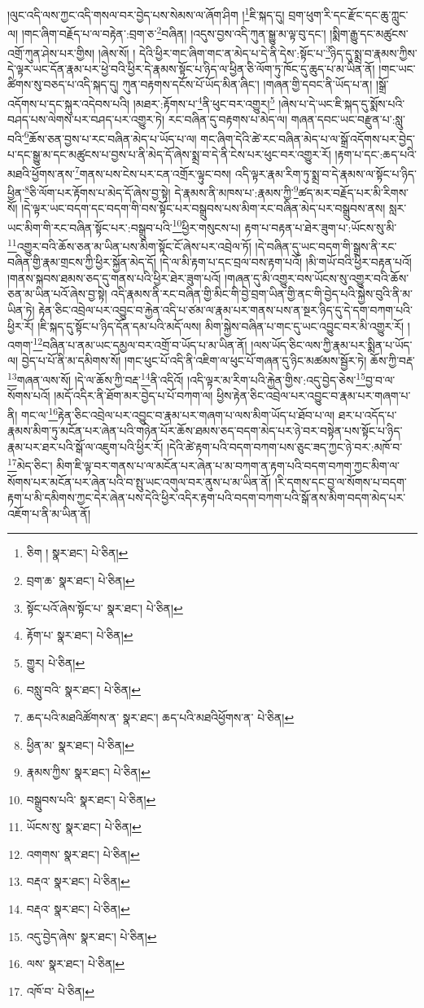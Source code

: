།ལུང་འདི་ལས་ཀྱང་འདི་གསལ་བར་བྱེད་པས་སེམས་ལ་ཞོག་ཤིག །\footnote{ཅིག །  སྣར་ཐང་།  པེ་ཅིན། }ཇི་སྐད་དུ། བྲག་ཕུག་རི་དང་རྫོང་དང་ཆུ་ཀླུང་ལ། །གང་ཞིག་བརྗོད་པ་ལ་བརྟེན་:བྲག་ཅ་\footnote{བྲག་ཆ་  སྣར་ཐང་།  པེ་ཅིན། }བཞིན། །འདུས་བྱས་འདི་ཀུན་སྒྱུ་མ་ལྟ་བུ་དང་། །སྨིག་རྒྱུ་དང་མཚུངས་འགྲོ་ཀུན་ཤེས་པར་གྱིས། །ཞེས་སོ། །
དེའི་ཕྱིར་གང་ཞིག་གང་ན་མེད་པ་དེ་ནི་དེས་:སྟོང་པ་\footnote{སྟོང་པའོ་ཞེས་སྟོང་པ་  སྣར་ཐང་།  པེ་ཅིན། }ཉིད་དུ་སྨྲ་བ་རྣམས་ཀྱིས་དེ་ལྟར་ཡང་དོན་རྣམ་པར་ཕྱེ་བའི་ཕྱིར་དེ་རྣམས་སྟོང་པ་ཉིད་ལ་ཕྱིན་ཅི་ལོག་ཏུ་ཁོང་དུ་ཆུད་པ་མ་ཡིན་ནོ། །གང་ཡང་ཚིགས་སུ་བཅད་པ་འདི་སྐད་དུ། ཀུན་བརྟགས་དངོས་པོ་ཡོད་མིན་ཞིང་། །གཞན་གྱི་དབང་ནི་ཡོད་པ་ན། །སྒྲོ་འདོགས་པ་དང་སྐུར་འདེབས་པའི། །མཐར་:རྟོགས་པ་\footnote{རྟོག་པ་  སྣར་ཐང་།  པེ་ཅིན། }ནི་ཕུང་བར་འགྱུར།\footnote{གྱུར།  པེ་ཅིན། } །ཞེས་པ་དེ་ཡང་ཇི་སྐད་དུ་སྨོས་པའི་བཤད་པས་ལེགས་པར་བཤད་པར་འགྱུར་ཏེ། རང་བཞིན་དུ་བརྟགས་པ་མེད་ལ། གཞན་དབང་ཡང་བརྫུན་པ་:སླུ་བའི་\footnote{བསླུ་བའི་  སྣར་ཐང་།  པེ་ཅིན། }ཆོས་ཅན་བྱས་པ་རང་བཞིན་མེད་པ་ཡོད་པ་ལ། གང་ཞིག་དེའི་ཚེ་རང་བཞིན་མེད་པ་ལ་སྒྲོ་འདོགས་པར་བྱེད་པ་དང་སྒྱུ་མ་དང་མཚུངས་པ་བྱས་པ་ནི་མེད་དོ་ཞེས་སྨྲ་བ་དེ་ནི་ངེས་པར་ཕུང་བར་འགྱུར་རོ། །རྟག་པ་དང་:ཆད་པའི་མཐའི་ཕྱོགས་ནས་\footnote{ཆད་པའི་མཐའིཚོགས་ན་  སྣར་ཐང་། ཆད་པའི་མཐའིཕྱོགས་ན་  པེ་ཅིན། }གནས་པས་ངེས་པར་ངན་འགྲོར་ལྟུང་བས། འདི་ལྟར་རྣམ་རིག་ཏུ་སྨྲ་བ་དེ་རྣམས་ལ་སྟོང་པ་ཉིད་ཕྱིན་\footnote{ཕྱིན་མ་  སྣར་ཐང་།  པེ་ཅིན། }ཅི་ལོག་པར་རྟོགས་པ་མེད་དོ་ཞེས་བྱ་སྟེ། དེ་རྣམས་ནི་མཁས་པ་:རྣམས་ཀྱི་\footnote{རྣམས་ཀྱིས་  སྣར་ཐང་།  པེ་ཅིན། }ཚད་མར་བརྗོད་པར་མི་རིགས་སོ། །དེ་ལྟར་ཡང་བདག་དང་བདག་གི་བས་སྟོང་པར་བསྒྲུབས་པས་མིག་རང་བཞིན་མེད་པར་བསྒྲུབས་ནས། སླར་ཡང་མིག་གི་རང་བཞིན་སྟོང་པར་:བསྒྲུབ་པའི་\footnote{བསྒྲུབས་པའི་  སྣར་ཐང་།  པེ་ཅིན། }ཕྱིར་གསུངས་པ། རྟག་པ་བརྟན་པ་ཐེར་ཟུག་པ་:ཡོངས་སུ་མི་\footnote{ཡོངས་སུ་  སྣར་ཐང་།  པེ་ཅིན། }འགྱུར་བའི་ཆོས་ཅན་མ་ཡིན་པས་མིག་སྟོང་ངོ་ཞེས་པར་འབྲེལ་ཏོ། །དེ་བཞིན་དུ་ཡང་བདག་གི་སྒྲས་ནི་རང་བཞིན་གྱི་རྣམ་གྲངས་ཀྱི་ཕྱིར་སྐྱོན་མེད་དོ། །དེ་ལ་མི་རྟག་པ་དང་བྲལ་བས་རྟག་པའོ། །མི་གཡོ་བའི་ཕྱིར་བརྟན་པའོ། །གནས་སྐབས་ཐམས་ཅད་དུ་གནས་པའི་ཕྱིར་ཐེར་ཟུག་པའོ། །གཞན་དུ་མི་འགྱུར་བས་ཡོངས་སུ་འགྱུར་བའི་ཆོས་ཅན་མ་ཡིན་པའོ་ཞེས་བྱ་སྟེ། འདི་རྣམས་ནི་རང་བཞིན་གྱི་མིང་གི་བྱེ་བྲག་ཡིན་གྱི་ནང་གི་བྱེད་པའི་སྐྱེས་བུའི་ནི་མ་ཡིན་ཏེ། རྟེན་ཅིང་འབྲེལ་པར་འབྱུང་བ་རྐྱེན་འདི་པ་ཙམ་ལ་རྣམ་པར་གནས་པས་ན་སྔར་ཉིད་དུ་དེ་དག་བཀག་པའི་ཕྱིར་རོ། །ཇི་སྐད་དུ་སྟོང་པ་ཉིད་དོན་དམ་པའི་མདོ་ལས། མིག་སྐྱེས་བཞིན་པ་གང་དུ་ཡང་འབྱུང་བར་མི་འགྱུར་རོ། །འགག་\footnote{འགགས་  སྣར་ཐང་།  པེ་ཅིན། }བཞིན་པ་ནམ་ཡང་དམྱལ་བར་འགྲོ་བ་ཡོད་པ་མ་ཡིན་ནོ། །ལས་ཡོད་ཅིང་ལས་ཀྱི་རྣམ་པར་སྨིན་པ་ཡོད་ལ། བྱེད་པ་པོ་ནི་མ་དམིགས་སོ། །གང་ཕུང་པོ་འདི་ནི་འཇིག་ལ་ཕུང་པོ་གཞན་དུ་ཉིང་མཚམས་སྦྱོར་ཏེ། ཆོས་ཀྱི་བརྡ་\footnote{བརྡའ་  སྣར་ཐང་།  པེ་ཅིན། }གཞན་ལས་སོ། །དེ་ལ་ཆོས་ཀྱི་བརྡ་\footnote{བརྡའ་  སྣར་ཐང་།  པེ་ཅིན། }ནི་འདིའོ། །འདི་ལྟར་མ་རིག་པའི་རྐྱེན་གྱིས་:འདུ་བྱེད་ཅེས་\footnote{འདུ་བྱེད་ཞེས་  སྣར་ཐང་།  པེ་ཅིན། }བྱ་བ་ལ་སོགས་པའོ། །མདོ་འདིར་ནི་ཐོག་མར་བྱེད་པ་པོ་བཀག་ལ། ཕྱིས་རྟེན་ཅིང་འབྲེལ་པར་འབྱུང་བ་རྣམ་པར་གཞག་པ་ནི། གང་ལ་\footnote{ལས་  སྣར་ཐང་།  པེ་ཅིན། }རྟེན་ཅིང་འབྲེལ་པར་འབྱུང་བ་རྣམ་པར་གཞག་པ་ལས་མིག་ཡོད་པ་ཐོབ་པ་ལ། ཐར་པ་འདོད་པ་རྣམས་མིག་ཏུ་མངོན་པར་ཞེན་པའི་གཉེན་པོར་ཆོས་ཐམས་ཅད་བདག་མེད་པར་ཉེ་བར་བསྟེན་པས་སྟོང་པ་ཉིད་རྣམ་པར་ཐར་པའི་སྒོ་ལ་འཇུག་པའི་ཕྱིར་རོ། །དེའི་ཚེ་རྟག་པའི་བདག་བཀག་པས་ཅུང་ཟད་ཀྱང་ཉེ་བར་:མཁོ་བ་\footnote{འཁོ་བ་  པེ་ཅིན། }མེད་ཅིང་། མིག་ཇི་ལྟ་བར་གནས་པ་ལ་མངོན་པར་ཞེན་པ་མ་བཀག་ན་རྟག་པའི་བདག་བཀག་ཀྱང་མིག་ལ་སོགས་པར་མངོན་པར་ཞེན་པའི་བ་སྤུ་ཡང་འགུལ་བར་ནུས་པ་མ་ཡིན་ནོ། །རི་དགས་དང་བྱ་ལ་སོགས་པ་བདག་རྟག་པ་མི་དམིགས་ཀྱང་དེར་ཞེན་པས་དེའི་ཕྱིར་འདིར་རྟག་པའི་བདག་བཀག་པའི་སྒོ་ནས་མིག་བདག་མེད་པར་འཇོག་པ་ནི་མ་ཡིན་ནོ། 